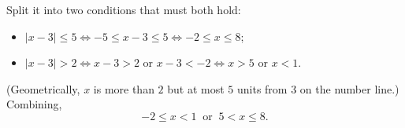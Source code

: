 Split it into two conditions that must both hold:
\begin{itemize}
\item $|x-3|\le5\iff-5\le x-3\le5\iff-2\le x\le8$;
\item $|x-3|>2\iff x-3>2$ or $x-3<-2\iff x>5$ or $x<1$.
\end{itemize}
(Geometrically, $x$ is more than $2$ but at most $5$ units from $3$ on the number line.) Combining,
\[
\boxed{-2\le x<1\ \text{ or }\ 5<x\le8}.
\]
